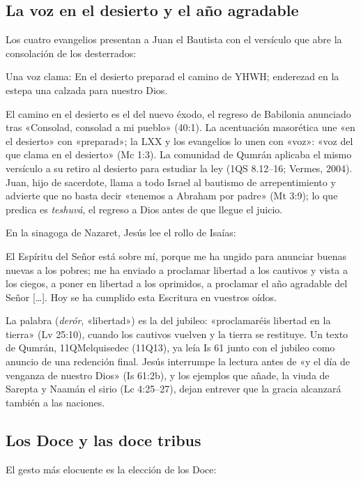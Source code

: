 \subsection{La voz en el desierto y el año agradable}
Los cuatro evangelios presentan a Juan el Bautista con el versículo que abre la consolación de los desterrados:

\begin{cita}Una voz clama: En el desierto preparad el camino de YHWH; enderezad en la estepa una calzada para nuestro Dios.\end{cita}

El camino en el desierto es el del nuevo éxodo, el regreso de Babilonia anunciado tras «Consolad, consolad a mi pueblo» (40:1). La acentuación masorética une «en el desierto» con «preparad»; la LXX y los evangelios lo unen con «voz»: «voz del que clama en el desierto» (Mc 1:3). La comunidad de Qumrán aplicaba el mismo versículo a su retiro al desierto para estudiar la ley (1QS 8.12--16; Vermes, 2004). Juan, hijo de sacerdote, llama a todo Israel al bautismo de arrepentimiento y advierte que no basta decir «tenemos a Abraham por padre» (Mt 3:9); lo que predica es \emph{teshuvá}, el regreso a Dios antes de que llegue el juicio.

En la sinagoga de Nazaret, Jesús lee el rollo de Isaías:

\begin{cita}El Espíritu del Señor está sobre mí, porque me ha ungido para anunciar buenas nuevas a los pobres; me ha enviado a proclamar libertad a los cautivos y vista a los ciegos, a poner en libertad a los oprimidos, a proclamar el año agradable del Señor [\ldots]. Hoy se ha cumplido esta Escritura en vuestros oídos.\end{cita}

La palabra  (\emph{derór}, «libertad») es la del jubileo: «proclamaréis libertad en la tierra» (Lv 25:10), cuando los cautivos vuelven y la tierra se restituye. Un texto de Qumrán, 11QMelquisedec (11Q13), ya leía Is 61 junto con el jubileo como anuncio de una redención final. Jesús interrumpe la lectura antes de «y el día de venganza de nuestro Dios» (Is 61:2b), y los ejemplos que añade, la viuda de Sarepta y Naamán el sirio (Lc 4:25--27), dejan entrever que la gracia alcanzará también a las naciones.

\subsection{Los Doce y las doce tribus}
El gesto más elocuente es la elección de los Doce:

